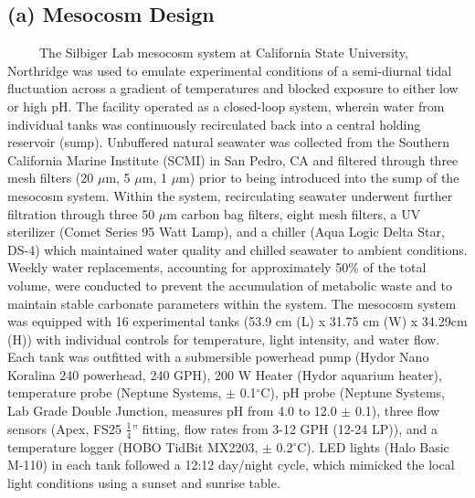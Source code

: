 \documentclass[
  12pt,
]{article}
\begin{document}
\vspace{0.5cm}

\hypertarget{a-mesocosm-design}{%
\subsection{(a) Mesocosm Design}\label{a-mesocosm-design}}

~~~~~The Silbiger Lab mesocosm system at California State University,
Northridge was used to emulate experimental conditions of a semi-diurnal
tidal fluctuation across a gradient of temperatures and blocked exposure
to either low or high pH. The facility operated as a closed-loop system,
wherein water from individual tanks was continuously recirculated back
into a central holding reservoir (sump). Unbuffered natural seawater was
collected from the Southern California Marine Institute (SCMI) in San
Pedro, CA and filtered through three mesh filters (20 \(\mu\)m, 5
\(\mu\)m, 1 \(\mu\)m) prior to being introduced into the sump of the
mesocosm system. Within the system, recirculating seawater underwent
further filtration through three 50 \(\mu\)m carbon bag filters, eight
mesh filters, a UV sterilizer (Comet Series 95 Watt Lamp), and a chiller
(Aqua Logic Delta Star, DS-4) which maintained water quality and chilled
seawater to ambient conditions. Weekly water replacements, accounting
for approximately 50\% of the total volume, were conducted to prevent
the accumulation of metabolic waste and to maintain stable carbonate
parameters within the system. The mesocosm system was equipped with 16
experimental tanks (53.9 cm (L) x 31.75 cm (W) x 34.29cm (H)) with
individual controls for temperature, light intensity, and water flow.
Each tank was outfitted with a submersible powerhead pump (Hydor Nano
Koralina 240 powerhead, 240 GPH), 200 W Heater (Hydor aquarium heater),
temperature probe (Neptune Systems, \(\pm\) 0.1\(^\circ\)C), pH probe
(Neptune Systems, Lab Grade Double Junction, measures pH from 4.0 to
12.0 \(\pm\) 0.1), three flow sensors (Apex, FS25 \(\frac{1}{4}\)''
fitting, flow rates from 3-12 GPH (12-24 LP)), and a temperature logger
(HOBO TidBit MX2203, \(\pm\) 0.2\(^\circ\)C). LED lights (Halo Basic
M-110) in each tank followed a 12:12 day/night cycle, which mimicked the
local light conditions using a sunset and sunrise table.
\end{document}

